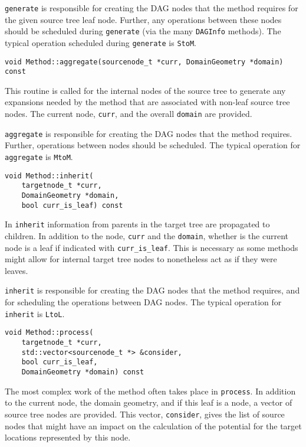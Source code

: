 \texttt{generate} is responsible for creating the DAG nodes that the method
requires for the given source tree leaf node. Further, any operations between
these nodes should be scheduled during \texttt{generate} (via the many
\texttt{DAGInfo} methods). The typical operation scheduled during
\texttt{generate} is \texttt{StoM}.


\begin{lstlisting}
void Method::aggregate(sourcenode_t *curr, DomainGeometry *domain) const
\end{lstlisting}

\noindent
This routine is called for the internal nodes of the source tree to generate
any expansions needed by the method that are associated with non-leaf source
tree nodes. The current node, \texttt{curr}, and the overall \texttt{domain}
are provided.

\texttt{aggregate} is responsible for creating the DAG nodes that the method
requires. Further, operations between nodes should be scheduled. The typical
operation for \texttt{aggregate} is \texttt{MtoM}.

\begin{lstlisting}
void Method::inherit(
    targetnode_t *curr,
    DomainGeometry *domain,
    bool curr_is_leaf) const
\end{lstlisting}

\noindent
In \texttt{inherit} information from parents in the target tree are propagated
to children. In addition to the node, \texttt{curr} and the \texttt{domain},
whether is the current node is a leaf if indicated with
\texttt{curr\_is\_leaf}. This is necessary as some methods might allow for
internal target tree nodes to nonetheless act as if they were leaves.

\texttt{inherit} is responsible for creating the DAG nodes that the method
requires, and for scheduling the operations between DAG nodes. The typical
operation for \texttt{inherit} is \texttt{LtoL}.


\begin{lstlisting}
void Method::process(
    targetnode_t *curr,
    std::vector<sourcenode_t *> &consider,
    bool curr_is_leaf,
    DomainGeometry *domain) const
\end{lstlisting}

\noindent
The most complex work of the method often takes place in \texttt{process}. In
addition to the current node, the domain geometry, and if this leaf is a node,
a vector of source tree nodes are provided. This vector, \texttt{consider},
gives the list of source nodes that might have an impact on the calculation of
the potential for the target locations represented by this node.

